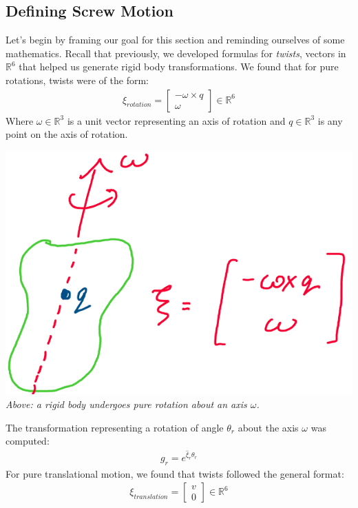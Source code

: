 \documentclass[oneside]{book}
\begin{document}
\subsection{Defining Screw Motion}
Let's begin by framing our goal for this section and reminding ourselves of some mathematics. Recall that previously, we developed formulas for \textit{twists}, vectors in $\mathbb{R}^6$ that helped us generate rigid body transformations. We found that for pure rotations, twists were of the form:
\begin{align}
    \xi_{rotation} = 
    \begin{bmatrix}
    -\omega \times q\\
    \omega
    \end{bmatrix} \in \mathbb{R}^6
\end{align}
Where $\omega \in \mathbb{R}^3$ is a unit vector representing an axis of rotation and $q\in \mathbb{R}^3$ is any point on the axis of rotation.
\begin{center}
    \includegraphics[scale=0.3]{images/rotationalTwist.png}\\
    \textit{Above: a rigid body undergoes pure rotation about an axis $\omega$.}
\end{center}
The transformation representing a rotation of angle $\theta_r$ about the axis $\omega$ was computed:
\begin{align}
    g_{r} = e^{\hat\xi_{r}\theta_r}
\end{align}
For pure translational motion, we found that twists followed the general format:
\begin{align}
    \xi_{translation} = 
    \begin{bmatrix}
    v\\
    0
    \end{bmatrix} \in \mathbb{R}^6
\end{align}
\end{document}
